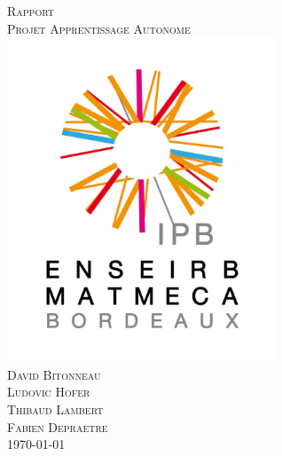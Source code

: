 \documentclass[a4paper, 11pt]{article}
\begin{document}
\begin{titlepage}
\begin{center}
\textsc{\huge Rapport}\\[3cm]
\textsc{\Huge Projet Apprentissage Autonome}\\[3cm]
\includegraphics[width=8cm]{logo-IPB.png}\\[3cm]
\textsc{\Large David Bitonneau}\\
\textsc{\Large Ludovic Hofer}\\
\textsc{\Large Thibaud Lambert}\\
\textsc{\Large Fabien Depraetre}\\[3cm]
\textsc{\Large \today}\\
\end{center}
\end{titlepage}

\clearpage
\tableofcontents
\clearpage


\end{document}
